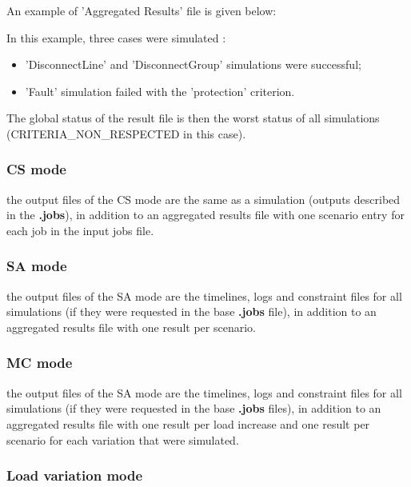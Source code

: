 \documentclass[a4paper, 12pt]{report}
\begin{document}
An example of 'Aggregated Results' file is given below:



In this example, three cases were simulated :
\begin{itemize}
  \item 'DisconnectLine' and 'DisconnectGroup' simulations were successful;
  \item 'Fault' simulation failed with the 'protection' criterion.
\end{itemize}
The global status of the result file is then the worst status of all simulations (CRITERIA\_NON\_RESPECTED in this case).

\subsubsection{CS mode}

the output files of the CS mode are the same as a \Dynawo simulation (outputs described in the \textbf{.jobs}), in addition to an aggregated 
results file with one scenario entry for each job in the input jobs file.


\subsubsection{SA mode}

the output files of the SA mode are the timelines, logs and constraint files for all simulations (if they were requested in the base \textbf{.jobs} file), in addition to an aggregated 
results file with one result per scenario.

\subsubsection{MC mode}

the output files of the SA mode are the timelines, logs and constraint files for all simulations (if they were requested in the base \textbf{.jobs} files), in addition to an aggregated 
results file with one result per load increase and one result per scenario for each variation that were simulated.




\subsubsection{Load variation mode}
\end{document}
